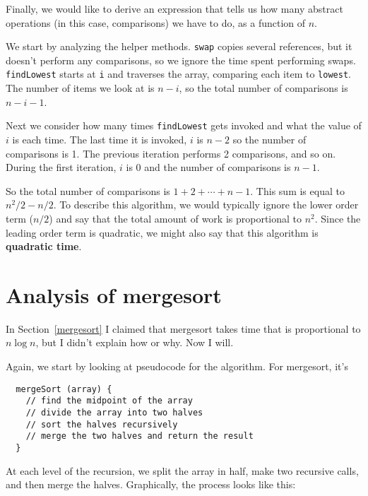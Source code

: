Finally, we would like to derive an expression that tells us how
many abstract operations (in this case, comparisons) we have to
do, as a function of $n$.


We start by analyzing the helper methods.  {\tt swap} copies several
references, but it doesn't perform any comparisons, so we ignore the
time spent performing swaps.  {\tt findLowest} starts at {\tt i} and
traverses the array, comparing each item to {\tt lowest}.  The number
of items we look at is $n-i$, so the total number of comparisons is
$n-i-1$.

Next we consider how many times {\tt findLowest}
gets invoked and what the value of $i$ is each time.  The last
time it is invoked, $i$ is $n-2$ so the number of
comparisons is 1.  The previous iteration performs 2 comparisons,
and so on.  During the first iteration, $i$ is $0$ and the
number of comparisons is $n-1$.

So the total number of comparisons is $1 + 2 + \cdots + n-1$.
This sum is equal to $n^2/2 - n/2$.  To describe this algorithm,
we would typically ignore the lower order term ($n/2$) and say
that the total amount of work is proportional to $n^2$.  Since
the leading order term is quadratic, we might also say that this
algorithm is {\bf quadratic time}.



\section {Analysis of mergesort}

In Section~\ref{mergesort} I claimed that mergesort takes time
that is proportional to $n \log n$, but I didn't explain how
or why.  Now I will.

Again, we start by looking at pseudocode for the algorithm.
For mergesort, it's

\begin{verbatim}
  mergeSort (array) {
    // find the midpoint of the array
    // divide the array into two halves
    // sort the halves recursively
    // merge the two halves and return the result
  }
\end{verbatim}
%
At each level of the recursion, we split the array in half,
make two recursive calls, and then merge the halves.  Graphically,
the process looks like this:
 

